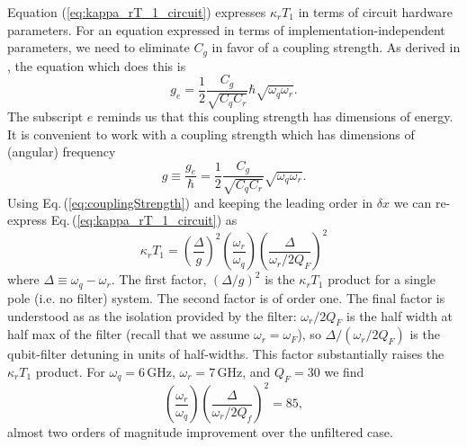 Equation (\ref{eq:kappa_rT_1_circuit}) expresses $\kappa_r T_1$ in terms of circuit hardware parameters. For an equation expressed in terms of implementation-independent parameters, we need to eliminate $C_g$ in favor of a coupling strength.
As derived in \citeinternaltype {}, the equation which does this is \begin{equation}
g_e = \frac{1}{2}\frac{C_g}{\sqrt{C_q C_r}} \hbar \sqrt{\omega_q \omega_r}. \end{equation}
The subscript $e$ reminds us that this coupling strength has dimensions of energy. It is convenient to work with a coupling strength which has dimensions of (angular) frequency \begin{equation}
g \equiv \frac{g_e}{\hbar} = \frac{1}{2}\frac{C_g}{\sqrt{C_q C_r}} \sqrt{\omega_q \omega_r}. \label{eq:couplingStrength} \end{equation}
Using Eq.\,(\ref{eq:couplingStrength}) and keeping the leading order in $\delta x$ we can re-express Eq.\,(\ref{eq:kappa_rT_1_circuit}) as \begin{equation}
\kappa_r T_1 = \left( \frac{\Delta}{g} \right)^2 \left( \frac{\omega_r}{\omega_q} \right) \left( \frac{\Delta}{\omega_r / 2 Q_F} \right) ^2 \label{eq:kappa_rT_1} \end{equation}
where $\Delta \equiv \omega_q - \omega_r$.
The first factor, $\left( \Delta / g \right)^2$ is the $\kappa_r T_1$ product for a single pole (i.e. no filter) system.
The second factor is of order one.
The final factor is understood as as the isolation provided by the filter: $\omega_r / 2 Q_F$ is the half width at half max of the filter (recall that we assume $\omega_r = \omega_F$), so $\Delta / \left( \omega_r/2 Q_F \right)$ is the qubit-filter detuning in units of half-widths.
This factor substantially raises the $\kappa_r T_1$ product.
For $\omega_q=6\,\text{GHz}$, $\omega_r = 7\,\text{GHz}$, and $Q_F=30$ we find \begin{equation}
\left( \frac{\omega_r}{\omega_q} \right) \left( \frac{\Delta}{\omega_r / 2 Q_f} \right)^2 = 85, \end{equation}
almost two orders of magnitude improvement over the unfiltered case.
